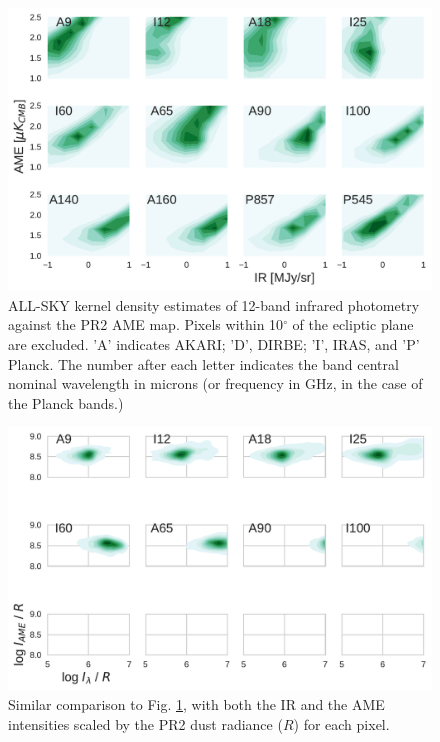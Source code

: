 {\begin{figure}
        \includegraphics[width=\textwidth]{../Plots/AMEvsDust_allsky_allbands.pdf}
        \centering
        \caption{ALL-SKY kernel density estimates of 12-band infrared photometry against the PR2 AME map. Pixels within 10$^{\circ}$ of the ecliptic plane are excluded. 'A' indicates AKARI; 'D', DIRBE; 'I', IRAS, and 'P' Planck. The number after each letter indicates the band central nominal wavelength in microns (or frequency in GHz, in the case of the Planck bands.) }
        \label{fig:AMEvsDust_allsky_allbands}
      \end{figure}

      \begin{figure}

        \includegraphics[width=\textwidth]{../Plots/AMEvsDust_allsky_allbands__mpsub_Rnorm_kde.pdf}
        \centering
        \caption{Similar comparison to Fig. \ref{fig:AMEvsDust_allsky_allbands}, with both the IR and the AME intensities scaled by the PR2 dust radiance ($R$) for each pixel. }
        \label{fig:AMEtoRvsDusttoR_allsky_allbands}
      \end{figure}

}
